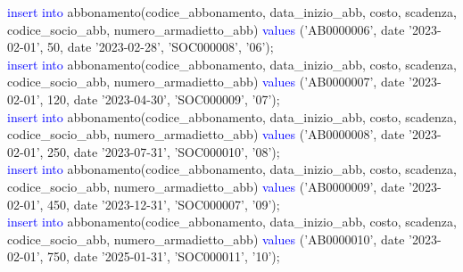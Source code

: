 \documentclass{article}
\begin{document}
\begin{flushleft}
{        \vspace{2mm}
        \hspace*{0.5em}\textcolor{blue}{insert into} abbonamento(codice\_abbonamento, data\_inizio\_abb, costo, scadenza, \hspace*{0.5em}codice\_socio\_abb, numero\_armadietto\_abb) \textcolor{blue}{values} ('AB0000006', date '2023-02-01', \hspace*{0.5em}50, date '2023-02-28', 'SOC000008', '06'); \\
        \vspace{2mm}
        \hspace*{0.5em}\textcolor{blue}{insert into} abbonamento(codice\_abbonamento, data\_inizio\_abb, costo, scadenza, \hspace*{0.5em}codice\_socio\_abb, numero\_armadietto\_abb) \textcolor{blue}{values} ('AB0000007', date '2023-02-01', \hspace*{0.5em}120, date '2023-04-30', 'SOC000009', '07'); \\
        \newpage
        \hspace*{0.5em}\textcolor{blue}{insert into} abbonamento(codice\_abbonamento, data\_inizio\_abb, costo, scadenza, \hspace*{0.5em}codice\_socio\_abb, numero\_armadietto\_abb) \textcolor{blue}{values} ('AB0000008', date '2023-02-01', \hspace*{0.5em}250, date '2023-07-31', 'SOC000010', '08'); \\
        \vspace{2mm}
        \hspace*{0.5em}\textcolor{blue}{insert into} abbonamento(codice\_abbonamento, data\_inizio\_abb, costo, scadenza, \hspace*{0.5em}codice\_socio\_abb, numero\_armadietto\_abb) \textcolor{blue}{values} ('AB0000009', date '2023-02-01', \hspace*{0.5em}450, date '2023-12-31', 'SOC000007', '09'); \\
        \vspace{2mm}
        \hspace*{0.5em}\textcolor{blue}{insert into} abbonamento(codice\_abbonamento, data\_inizio\_abb, costo, scadenza, \hspace*{0.5em}codice\_socio\_abb, numero\_armadietto\_abb) \textcolor{blue}{values} ('AB0000010', date '2023-02-01', \hspace*{0.5em}750, date '2025-01-31', 'SOC000011', '10'); \\
        \vspace{2mm}
}
\end{flushleft}
\end{document}
